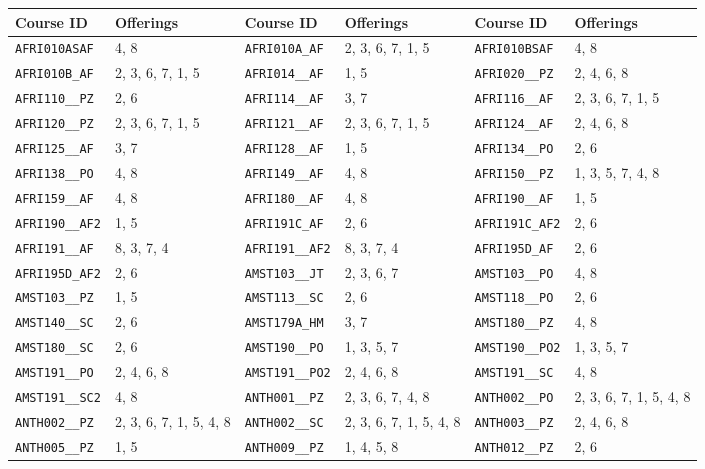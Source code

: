 \begin{longtable}{|l|l||l|l||l|l|}
    \hline
    Course ID & Offerings & Course ID & Offerings & Course ID & Offerings\\\hline
    \verb|AFRI010ASAF| & 4, 8 & \verb|AFRI010A_AF| & 2, 3, 6, 7, 1, 5 & \verb|AFRI010BSAF| & 4, 8\\\hline
    \verb|AFRI010B_AF| & 2, 3, 6, 7, 1, 5 & \verb|AFRI014__AF| & 1, 5 & \verb|AFRI020__PZ| & 2, 4, 6, 8\\\hline
    \verb|AFRI110__PZ| & 2, 6 & \verb|AFRI114__AF| & 3, 7 & \verb|AFRI116__AF| & 2, 3, 6, 7, 1, 5\\\hline
    \verb|AFRI120__PZ| & 2, 3, 6, 7, 1, 5 & \verb|AFRI121__AF| & 2, 3, 6, 7, 1, 5 & \verb|AFRI124__AF| & 2, 4, 6, 8\\\hline
    \verb|AFRI125__AF| & 3, 7 & \verb|AFRI128__AF| & 1, 5 & \verb|AFRI134__PO| & 2, 6\\\hline
    \verb|AFRI138__PO| & 4, 8 & \verb|AFRI149__AF| & 4, 8 & \verb|AFRI150__PZ| & 1, 3, 5, 7, 4, 8\\\hline
    \verb|AFRI159__AF| & 4, 8 & \verb|AFRI180__AF| & 4, 8 & \verb|AFRI190__AF| & 1, 5\\\hline
    \verb|AFRI190__AF2| & 1, 5 & \verb|AFRI191C_AF| & 2, 6 & \verb|AFRI191C_AF2| & 2, 6\\\hline
    \verb|AFRI191__AF| & 8, 3, 7, 4 & \verb|AFRI191__AF2| & 8, 3, 7, 4 & \verb|AFRI195D_AF| & 2, 6\\\hline
    \verb|AFRI195D_AF2| & 2, 6 & \verb|AMST103__JT| & 2, 3, 6, 7 & \verb|AMST103__PO| & 4, 8\\\hline
    \verb|AMST103__PZ| & 1, 5 & \verb|AMST113__SC| & 2, 6 & \verb|AMST118__PO| & 2, 6\\\hline
    \verb|AMST140__SC| & 2, 6 & \verb|AMST179A_HM| & 3, 7 & \verb|AMST180__PZ| & 4, 8\\\hline
    \verb|AMST180__SC| & 2, 6 & \verb|AMST190__PO| & 1, 3, 5, 7 & \verb|AMST190__PO2| & 1, 3, 5, 7\\\hline
    \verb|AMST191__PO| & 2, 4, 6, 8 & \verb|AMST191__PO2| & 2, 4, 6, 8 & \verb|AMST191__SC| & 4, 8\\\hline
    \verb|AMST191__SC2| & 4, 8 & \verb|ANTH001__PZ| & 2, 3, 6, 7, 4, 8 & \verb|ANTH002__PO| & 2, 3, 6, 7, 1, 5, 4, 8\\\hline
    \verb|ANTH002__PZ| & 2, 3, 6, 7, 1, 5, 4, 8 & \verb|ANTH002__SC| & 2, 3, 6, 7, 1, 5, 4, 8 & \verb|ANTH003__PZ| & 2, 4, 6, 8\\\hline
    \verb|ANTH005__PZ| & 1, 5 & \verb|ANTH009__PZ| & 1, 4, 5, 8 & \verb|ANTH012__PZ| & 2, 6\\\hline

\end{longtable}
